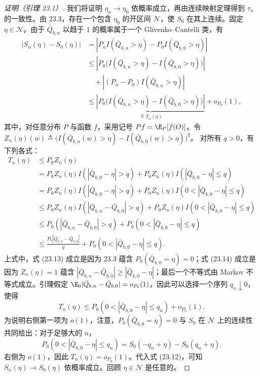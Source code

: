 \begin{proof}[证明（引理 23.1）]
我们将证明 $\eta_n\to\eta_0$ 依概率成立，再由连续映射定理得到 $\tau_n$ 的一致性。由 23.3，存在一个包含 $\eta_0$ 的开区间 $\mathcal N$，使 $S_0$ 在其上连续。固定 $\eta\in\mathcal N$。由于 $\bar Q_{b,n}$ 以趋于 1 的概率属于一个 Glivenko--Cantelli 类，有
\begin{equation}
\begin{aligned}
 |S_n(\eta)-S_0(\eta)|
 &=|P_nI(\bar Q_{b,n}>\eta)-P_0I(\bar Q_{b,0}>\eta)|\\
 &\leq\left|P_0\bigl(I(\bar Q_{b,n}>\eta)-I(\bar Q_{b,0}>\eta)\bigr)\right|\\
 &\quad+|(P_n-P_0)I(\bar Q_{b,n}>\eta)|\\
 &\leq\underbrace{\left|P_0\bigl(I(\bar Q_{b,n}>\eta)-I(\bar Q_{b,0}>\eta)\bigr)\right|}_{\triangleq T_n(\eta)}
 +o_{P_0}(1),
\end{aligned}
\tag{23.12}
\end{equation}
其中，对任意分布 $P$ 与函数 $f$，采用记号 $Pf=\E_P[f(O)]$。令
$Z_n(\eta)(w)\triangleq\bigl(I(\bar Q_{b,n}(w)>\eta)-I(\bar Q_{b,0}(w)>\eta)\bigr)^2$。
对所有 $q>0$，有下列各式：
\begin{align}
 T_n(\eta)&\leq P_0Z_n(\eta)\nonumber\\
 &=P_0Z_n(\eta)I(|\bar Q_{b,0}-\eta|>q)
 +P_0Z_n(\eta)I(|\bar Q_{b,0}-\eta|\leq q)\nonumber\\
 &=P_0Z_n(\eta)I(|\bar Q_{b,0}-\eta|>q)
 +P_0Z_n(\eta)I(0<|\bar Q_{b,0}-\eta|\leq q)\tag{23.13}\\
 &\leq P_0Z_n(\eta)I(|\bar Q_{b,n}-\bar Q_{b,0}|>q)
 +P_0Z_n(\eta)I(0<|\bar Q_{b,0}-\eta|\leq q)\tag{23.14}\\
 &\leq P_0(|\bar Q_{b,n}-\bar Q_{b,0}|>q)
 +P_0(0<|\bar Q_{b,0}-\eta|\leq q)\nonumber\\
 &\leq\frac{P_0|\bar Q_{b,n}-\bar Q_{b,0}|}{q}
 +P_0(0<|\bar Q_{b,0}-\eta|\leq q).\nonumber
\end{align}
上式中，式 (23.13) 成立是因为 23.3 蕴含 $P_0(\bar Q_{b,0}=\eta)=0$；式 (23.14) 成立是因为 $Z_n(\eta)=1$ 蕴含
$|\bar Q_{b,n}-\bar Q_{b,0}|\geq|\bar Q_{b,0}-\eta|$；最后一个不等式由 Markov 不等式成立。引理假定 $\E_0|\bar Q_{b,n}-\bar Q_{b,0}|=o_{P_0}(1)$，因此可以选择一个序列 $q_n\downarrow0$，使得
\[
 T_n(\eta)\leq P_0(0<|\bar Q_{b,0}-\eta|\leq q_n)+o_{P_0}(1).
\]
为说明右侧第一项为 $o(1)$，注意，$P_0(\bar Q_{b,0}=\eta)=0$ 与 $S_0$ 在 $\mathcal N$ 上的连续性共同给出：对于足够大的 $n$，
\[
 P_0(0<|\bar Q_{b,0}-\eta|\leq q_n)=S_0(-q_n+\eta)-S_0(q_n+\eta).
\]
右侧为 $o(1)$，因此 $T_n(\eta)=o_{P_0}(1)$。代入式 (23.12)，可知 $S_n(\eta)\to S_0(\eta)$ 依概率成立。回顾 $\eta\in\mathcal N$ 是任意的。


\end{proof}
